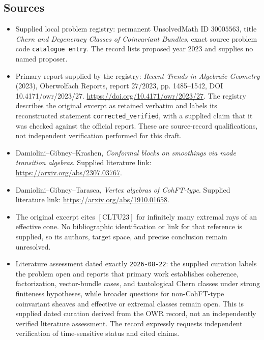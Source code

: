 \documentclass[11pt]{article}
\begin{document}
\subsection{Sources}
\begin{itemize}
\item Supplied local problem registry: permanent UnsolvedMath ID \(30005563\), title \emph{Chern and Degeneracy Classes of Coinvariant Bundles}, exact source problem code \texttt{catalogue entry}. The record lists proposed year 2023 and supplies no named proposer.
\item Primary report supplied by the registry: \emph{Recent Trends in Algebraic Geometry} (2023), Oberwolfach Reports, report 27/2023, pp. 1485--1542, DOI 10.4171/owr/2023/27. \url{https://doi.org/10.4171/owr/2023/27}. The registry describes the original excerpt as retained verbatim and labels its reconstructed statement \texttt{corrected\_verified}, with a supplied claim that it was checked against the official report. These are source-record qualifications, not independent verification performed for this draft.
\item Damiolini--Gibney--Krashen, \emph{Conformal blocks on smoothings via mode transition algebras}. Supplied literature link: \url{https://arxiv.org/abs/2307.03767}.
\item Damiolini--Gibney--Tarasca, \emph{Vertex algebras of CohFT-type}. Supplied literature link: \url{https://arxiv.org/abs/1910.01658}.
\item The original excerpt cites \([\mathrm{CLTU23}]\) for infinitely many extremal rays of an effective cone. No bibliographic identification or link for that reference is supplied, so its authors, target space, and precise conclusion remain unresolved.
\item Literature assessment dated exactly \texttt{2026-08-22}: the supplied curation labels the problem open and reports that primary work establishes coherence, factorization, vector-bundle cases, and tautological Chern classes under strong finiteness hypotheses, while broader questions for non-CohFT-type coinvariant sheaves and effective or extremal classes remain open. This is supplied dated curation derived from the OWR record, not an independently verified literature assessment. The record expressly requests independent verification of time-sensitive status and cited claims.
\end{itemize}
\end{document}
